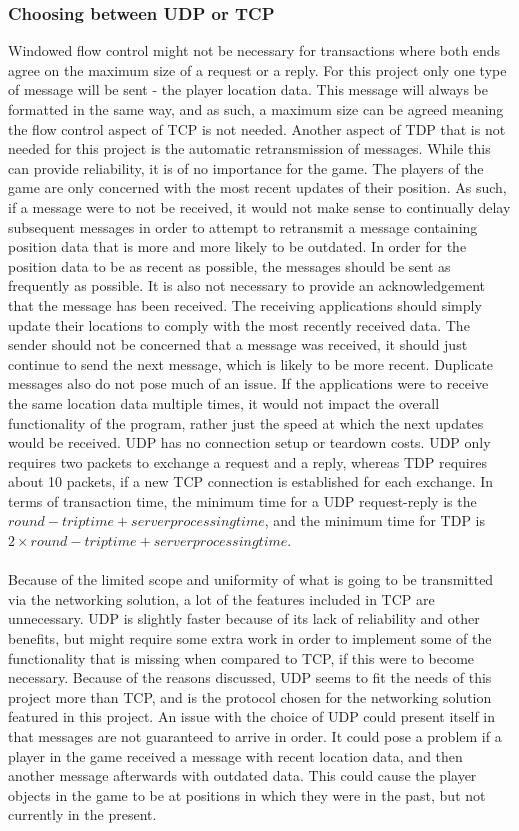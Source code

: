 \subsubsection{Choosing between UDP or TCP}
Windowed flow control might not be necessary for transactions where both ends agree on the maximum size of a request or a reply\cite{socketnetworking}.
For this project only one type of message will be sent - the player location data.
This message will always be formatted in the same way, and as such, a maximum size can be agreed meaning the flow control aspect of TCP is not needed.
Another aspect of TDP that is not needed for this project is the automatic retransmission of messages.
While this can provide reliability, it is of no importance for the game.
The players of the game are only concerned with the most recent updates of their position.
As such, if a message were to not be received, it would not make sense to continually delay subsequent messages in order to attempt to retransmit a message containing position data that is more and more likely to be outdated.
In order for the position data to be as recent as possible, the messages should be sent as frequently as possible.
It is also not necessary to provide an acknowledgement that the message has been received.
The receiving applications should simply update their locations to comply with the most recently received data.
The sender should not be concerned that a message was received, it should just continue to send the next message, which is likely to be more recent.
Duplicate messages also do not pose much of an issue.
If the applications were to receive the same location data multiple times, it would not impact the overall functionality of the program, rather just the speed at which the next updates would be received.
UDP has no connection setup or teardown costs.
UDP only requires two packets to exchange a request and a reply, whereas TDP requires about 10 packets\cite{socketnetworking}, if a new TCP connection is established for each exchange.
In terms of transaction time, the minimum time for a UDP request-reply is the $round-trip time + server processing time$, and the minimum time for TDP is $2 \times round-trip time + server processing time$\cite{socketnetworking}.
\\\\
Because of the limited scope and uniformity of what is going to be transmitted via the networking solution, a lot of the features included in TCP are unnecessary.
UDP is slightly faster because of its lack of reliability and other benefits, but might require some extra work in order to implement some of the functionality that is missing when compared to TCP, if this were to become necessary.
Because of the reasons discussed, UDP seems to fit the needs of this project more than TCP, and is the protocol chosen for the networking solution featured in this project.
An issue with the choice of UDP could present itself in that messages are not guaranteed to arrive in order.
It could pose a problem if a player in the game received a message with recent location data, and then another message afterwards with outdated data.
This could cause the player objects in the game to be at positions in which they were in the past, but not currently in the present.

